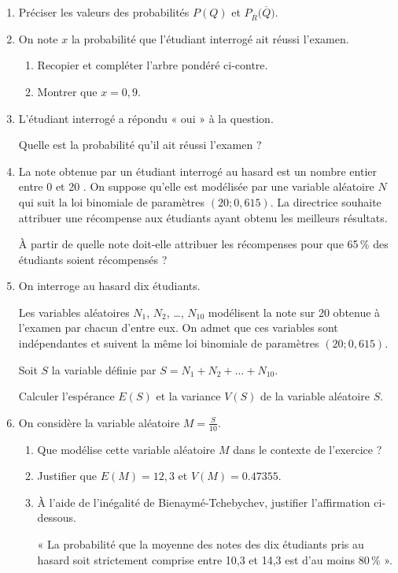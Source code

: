 \begin{enumerate}
	\item Préciser les valeurs des probabilités $P(Q)$ et $P_{\overline{R}} \big(\overline{Q}\big)$.
	\item On note $x$ la probabilité que l'étudiant interrogé ait réussi l'examen.
	
	\begin{enumerate}
		\item Recopier et compléter l'arbre pondéré ci-contre.
		\item Montrer que $x=0,9$.
	\end{enumerate}
	\item L'étudiant interrogé a répondu « oui » à la question.
	
	Quelle est la probabilité qu'il ait réussi l'examen ?
	\item La note obtenue par un étudiant interrogé au hasard est un nombre entier entre 0 et 20 . On suppose qu'elle est modélisée par une variable aléatoire $N$ qui suit la loi binomiale de paramètres $(20;0,615)$. La directrice souhaite attribuer une récompense aux étudiants ayant obtenu les meilleurs résultats.
	
	À partir de quelle note doit-elle attribuer les récompenses pour que 65\,\% des étudiants soient récompensés ?
	\item On interroge au hasard dix étudiants.
	
	Les variables aléatoires $N_{1}$, $N_{2}$, \ldots, $N_{10}$ modélisent la note sur 20 obtenue à l'examen par chacun d'entre eux. On admet que ces variables sont indépendantes et suivent la même loi binomiale de paramètres $(20;0,615)$.
	
	Soit $S$ la variable définie par $S=N_{1}+N_{2}+\ldots+N_{10}$.
	
	Calculer l'espérance $E(S)$ et la variance $V(S)$ de la variable aléatoire $S$.
	\item On considère la variable aléatoire $M=\frac{S}{10}$.
	
	\begin{enumerate}
		\item Que modélise cette variable aléatoire $M$ dans le contexte de l'exercice ?
		\item Justifier que $E(M)=12,3$ et $V(M)=\num{0,47355}$.
		\item À l'aide de l'inégalité de Bienaymé-Tchebychev, justifier l'affirmation ci-dessous.
		
		\medskip
		
		« La probabilité que la moyenne des notes des dix étudiants pris au hasard soit strictement comprise entre 10,3 et 14,3 est d'au moins 80\,\% ».
	\end{enumerate}
\end{enumerate}